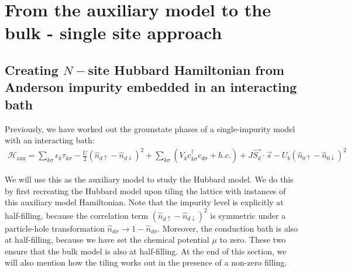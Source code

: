 \documentclass{report}
\numberwithin{equation}{section}
\begin{document}
\chapter{From the auxiliary model to the bulk - single site approach}
\label{chap:tile}

\section{Creating \(N-\)site Hubbard Hamiltonian from Anderson impurity embedded in an interacting bath}

Previously, we have worked out the grounstate phases of a single-impurity model with an interacting bath:
\begin{equation}\begin{aligned}
	\label{siam_attr}
	\mathcal{H}_\text{aux} = \sum_{k\sigma}\epsilon_k \tau_{k\sigma} - \frac{U}{2}\left(\hat n_{d \uparrow} - \hat n_{d \downarrow} \right) ^2 + \sum_{k\sigma} \left(V_{k} c^\dagger_{k\sigma} c_{d\sigma} + h.c.\right) +J \vec{S_d}\cdot\vec{s} - U_b\left(\hat n_{0 \uparrow} - \hat n_{0 \downarrow}\right)^2 
\end{aligned}\end{equation}
 
We will use this as the auxiliary model to study the Hubbard model. We do this by first recreating the Hubbard model upon tiling the lattice with instances of this auxiliary model Hamiltonian. Note that the impurity level is explicitly at half-filling, because the correlation term \(\left( \hat n_{d \uparrow} - \hat n_{d \downarrow} \right) ^2\) is symmetric under a particle-hole transformation \(\hat n_{d\sigma} \to 1 - \hat n_{d\sigma}\). Moreover, the conduction bath is also at half-filling, because we have set the chemical potential \(\mu\) to zero. These two ensure that the bulk model is also at half-filling. At the end of this section, we will also mention how the tiling works out in the presence of a non-zero filling.
\end{document}
